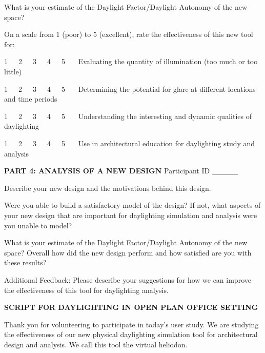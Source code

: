 \documentclass[12pt]{article}
\begin{document}
What is your estimate of the Daylight Factor/Daylight Autonomy of the
new space?
\vspace{1.7in}


On a scale from 1 (poor) to 5 (excellent), rate the effectiveness of
this new tool for:

1~~~2~~~3~~~4~~~5~~~ Evaluating the quantity of illumination (too much or too little)

1~~~2~~~3~~~4~~~5~~~ Determining the potential for glare at different locations and time periods

1~~~2~~~3~~~4~~~5~~~ Understanding the interesting and dynamic qualities of daylighting

1~~~2~~~3~~~4~~~5~~~ Use in architectural education for daylighting study and analysis



\newpage

{\bf PART 4: ANALYSIS OF A NEW DESIGN }
\hfill Participant ID \verb+_______+
\vspace{0.2in}


Describe your new design and the motivations behind this design.  
\vspace{1.7in}


Were you able to build a satisfactory model of the design?  If not,
what aspects of your new design that are important for daylighting
simulation and analysis were you unable to model?  
\vspace{1.7in}



What is your estimate of the Daylight Factor/Daylight Autonomy of the
new space?  Overall how did the new design perform and how satisfied
are you with these results?
\vspace{1.7in}



Additional Feedback: Please describe your suggestions for how we can
improve the effectiveness of this tool for daylighting analysis.
\vspace{1.7in}





\renewcommand\arraystretch{1.0}


{\bf SCRIPT FOR DAYLIGHTING IN OPEN PLAN OFFICE SETTING}
\vspace{0.1in}

Thank you for volunteering to participate in today's user study.  We
are studying the effectiveness of our new physical daylighting
simulation tool for architectural design and analysis.  We call this
tool the virtual heliodon.
\end{document}
